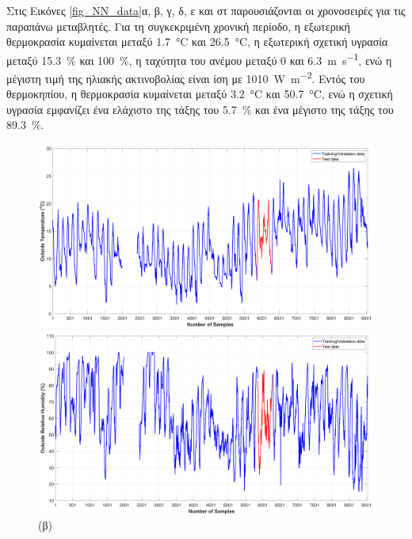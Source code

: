 \documentclass[12pt, a4paper]{report} %
\begin{document}
Στις Εικόνες \ref{fig_NN_data}α, β, γ, δ, ε και στ παρουσιάζονται οι χρονοσειρές για τις παραπάνω μεταβλητές. Για τη 
συγκεκριμένη χρονική περίοδο, η εξωτερική θερμοκρασία κυμαίνεται μεταξύ \SI{1,7}{\degreeCelsius} και 
\SI{26,5}{\degreeCelsius}, η εξωτερική σχετική υγρασία μεταξύ \SI{15,3}{\percent} και \SI{100}{\percent}, η ταχύτητα 
του ανέμου μεταξύ 0 και \SI{6,3}{\meter\per\second}, ενώ η μέγιστη τιμή της ηλιακής ακτινοβολίας είναι ίση με 
\SI{1010}{\watt\per\meter\squared}. Εντός του θερμοκηπίου, η θερμοκρασία κυμαίνεται μεταξύ \SI{3,2}{\degreeCelsius} και 
\SI{50,7}{\degreeCelsius}, ενώ η σχετική υγρασία εμφανίζει ένα ελάχιστο της τάξης του \SI{5,7}{\percent} και ένα μέγιστο 
της τάξης του \SI{89,3}{\percent}.

\clearpage

\begin{figure}[ht]
    \begin{adjustwidth}{-1.2cm}{0cm}
        \begin{minipage}{0.48\textwidth}
            \centering
            \includegraphics[scale=0.21]{Figures/NN_T_out.png}
            \caption*{\hspace{35pt}(α)}{}
        \end{minipage}
        \hfill
        \begin{minipage}[c]{0.48\textwidth}
            \centering
            \includegraphics[scale=0.21]{Figures/NN_RH_out.png}
            \caption*{\hspace{35pt}(β)}{}
        \end{minipage}


\end{adjustwidth}
\end{figure}
\end{document}
